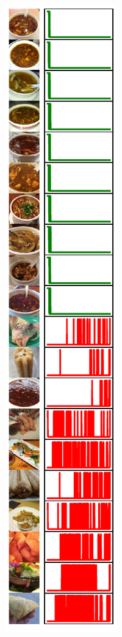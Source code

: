 \begin{figure}[t]
\begin{subfigure}[b]{0.23\linewidth}
\end{subfigure}
\hfill
\begin{subfigure}[b]{0.23\linewidth}
  \centering
  \includegraphics[width=\linewidth]{figs/sptd/food_points_ext.pdf}

\end{subfigure}
\end{figure}
